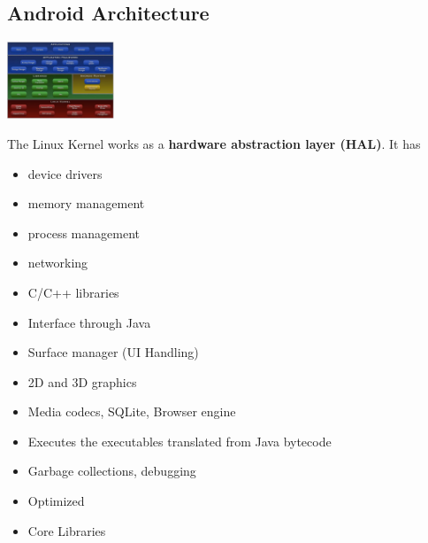 \subsection{Android Architecture}
\begin{breakbox}

\includegraphics[width=0.24\textwidth]{figures/architectureOverview.png}

\end{breakbox}

\begin{breakbox}

The Linux Kernel works as a \textbf{hardware abstraction layer (HAL)}.
It has 

\begin{itemize}
    \item device drivers
    \item memory management
    \item process management
    \item networking
\end{itemize}

\end{breakbox}

\begin{breakbox}

\begin{itemize}
\tightlist
\item
  C/C++ libraries
\item
  Interface through Java
\item
  Surface manager (UI Handling)
\item
  2D and 3D graphics
\item
  Media codecs, SQLite, Browser engine
\end{itemize}

\end{breakbox}

\begin{breakbox}

\begin{itemize}
\tightlist
\item
  Executes the executables translated from Java bytecode
\item
  Garbage collections, debugging
\item
  Optimized
\item
  Core Libraries
\end{itemize}

\end{breakbox}

